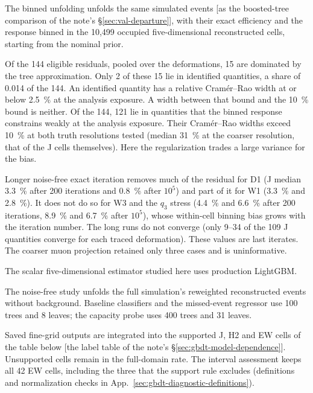 The binned unfolding unfolds the same simulated events [as the boosted-tree comparison of the note's \S\ref{sec:val-departure}], with their exact efficiency and the response binned in the 10,499 occupied five-dimensional reconstructed cells, starting from the nominal prior.

Of the 144 eligible residuals, pooled over the deformations, 15 are dominated by the tree approximation. Only 2 of these 15 lie in identified quantities, a share of 0.014 of the 144. An identified quantity has a relative Cram\'er--Rao width at or below \SI{2.5}{\percent} at the analysis exposure. A width between that bound and the \SI{10}{\percent} bound is neither. Of the 144, 121 lie in quantities that the binned response constrains weakly at the analysis exposure. Their Cram\'er--Rao widths exceed \SI{10}{\percent} at both truth resolutions tested (median \SI{31}{\percent} at the coarser resolution, that of the J cells themselves). Here the regularization trades a large variance for the bias.

Longer noise-free exact iteration removes much of the residual for D1 (J median \SI{3.3}{\percent} after 200 iterations and \SI{0.8}{\percent} after $10^{5}$) and part of it for W1 (\SI{3.3}{\percent} and \SI{2.8}{\percent}). It does not do so for W3 and the $q_3$ stress (\SI{4.4}{\percent} and \SI{6.6}{\percent} after 200 iterations, \SI{8.9}{\percent} and \SI{6.7}{\percent} after $10^{5}$), whose within-cell binning bias grows with the iteration number. The long runs do not converge (only 9--34 of the 109 J quantities converge for each traced deformation). These values are last iterates. The coarser muon projection retained only three cases and is uninformative.

The scalar five-dimensional estimator studied here uses production LightGBM.

The noise-free study unfolds the full simulation's reweighted reconstructed events without background. Baseline classifiers and the missed-event regressor use 100 trees and 8 leaves; the capacity probe uses 400 trees and 31 leaves.

Saved fine-grid outputs are integrated into the supported J, H2 and EW cells of the table below [the label table of the note's \S\ref{sec:gbdt-model-dependence}]. Unsupported cells remain in the full-domain rate. The interval assessment keeps all 42 EW cells, including the three that the support rule excludes (definitions and normalization checks in App.~\ref{sec:gbdt-diagnostic-definitions}).

